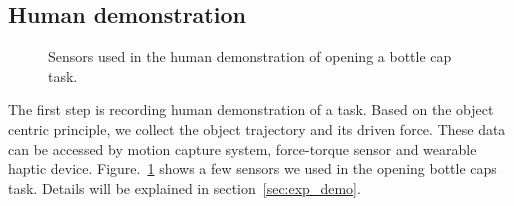 \subsection{Human demonstration}
\label{sec:demo}


\begin{figure}
  \centering
    \caption{\scriptsize{Sensors used in the human demonstration of opening a bottle cap task.}}
  \label{fig:devices}
\end{figure}

The first step is recording human demonstration of a task. Based on the object centric principle, we collect the object trajectory and its driven force. These data can be accessed by motion capture system, force-torque sensor and wearable haptic device. Figure.~\ref{fig:devices} shows a few sensors we used in the opening bottle caps task. Details will be explained in section~\ref{sec:exp_demo}.


